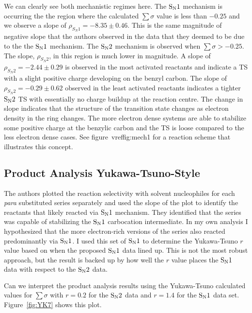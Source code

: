 \documentclass{tufte-handout}
\begin{document}
We can clearly see both mechanistic regimes here. The $\rm S_N1$ mechanism is occurring the the region where the calculated $\sum \sigma$ value is less than $-0.25$ and we observe a slope of $\rho_{{S_N1}} = -8.35 \pm 0.46$. This is the same magnitude of negative slope that the authors observed in the data that they deemed to be due to the the $\rm S_N1$ mechanism. The $\rm S_N2$ mechanism is observed when $\sum \sigma > -0.25$. The slope, $\rho_{S_N2}$, in this region is much lower in magnitude. A slope of $\rho_{S_N2} = -2.44 \pm 0.29$ is observed in the most activated reactants and indicate a TS with a slight positive charge developing on the benzyl carbon. The slope of $\rho_{S_N2} = -0.29 \pm 0.62$ observed in the least activated reactants indicates a tighter $\rm S_N2$ TS with essentially no charge buildup at the reaction centre. The change in slope indicates that the structure of the transition state changes as electron density in the ring changes. The more electron dense systems are able to stabilize some positive charge at the benzylic carbon and the TS is loose compared to the less electron dense cases. See figure~vref{fig:mech1} for a reaction scheme that illustrates this concept.

\subsection{Product Analysis Yukawa-Tsuno-Style}

The authors plotted the reaction selectivity with solvent nucleophiles for each \textit{para} substituted series separately and used the slope of the plot to identify the reactants that likely reacted via $\rm S_N1$ mechanism. They identified that the  series was capable of stabilizing the $\rm S_N1$ carbocation intermediate. In my own analysis I hypothesized that the more electron-rich versions of the  series also reacted predominantly via  $\rm S_N1$. I used this set of $\rm S_N1$ to determine the Yukawa-Tsuno $r$ value based on when the proposed $\rm S_N1$ data lined up. This is not the most robust approach, but the result is backed up by how well the $r$ value places the $\rm S_N1$ data with respect to the $\rm S_N2$ data. 

Can we interpret the product analysis results using the Yukawa-Tsuno calculated values for $\sum \sigma$ with $r = 0.2$ for the $\rm S_N2$ data and $r = 1.4$ for the $\rm S_N1$ data set. Figure~\vref{fig:YK7} shows this plot. 
\end{document}
